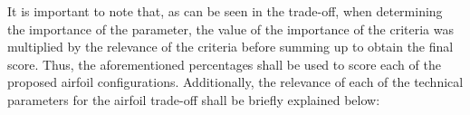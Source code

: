 \begin{table}[h]
\caption{Airfoil criteria}
\label{tab:crit_airfoil}
\end{table}

It is important to note that, as can be seen in the trade-off, when determining the importance of the parameter, the value of the importance of the criteria was multiplied by the relevance of the criteria before summing up to obtain the final score.
Thus, the aforementioned percentages shall be used to score each of the proposed airfoil configurations.
Additionally, the relevance of each of the technical parameters for the airfoil trade-off shall be briefly explained below:

